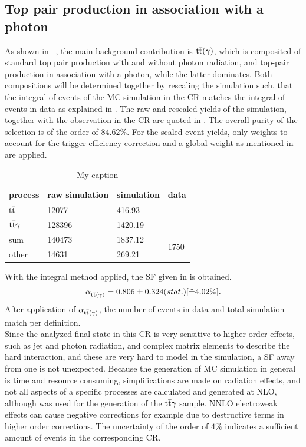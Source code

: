 \subsection{Top pair production in association with a photon}\label{sec:ttbar}
As shown in ~, the main background contribution is ${\mathrm{t}\overline{\mathrm{t}}}(\gamma)$, which is composited of standard top pair production with and without photon radiation, and top-pair production in association with a photon, while the latter dominates. Both compositions will be determined together by rescaling the simulation such, that the integral of events of the MC simulation in the CR matches the integral of events in data as explained in . The raw and rescaled yields of the simulation, together with the observation in the CR are quoted in . The overall purity of the selection is of the order of $84.62\%$. For the scaled event yields, only weights to account for the trigger efficiency correction and a global weight as mentioned in  are applied.
\begin{table}[htb]
 \centering
 \caption{My caption}
 \label{tab:CRTT}
 \begin{tabular}{llll}
  
  process      & raw simulation & simulation & data                  \\\hline
  ${\mathrm{t}\overline{\mathrm{t}}}$     & 12077          & 416.93     &                       \\
  ${\mathrm{t}\overline{\mathrm{t}}}\gamma$ & 128396         & 1420.19    &                       \\\hline\hline
  sum          & 140473         & 1837.12    & \multirow{2}{*}{1750} \\
  other        & 14631          & 269.21     &                       
 \end{tabular}
\end{table}
With the integral method applied, the SF given in  is obtained.
\begin{equation}\label{eq:AlphaTT}
 \alpha_{{\mathrm{t}\overline{\mathrm{t}}}(\gamma)}=0.806 \pm 0.324 (stat.) [\hat{=}4.02\%].
\end{equation}
After application of $\alpha_{{\mathrm{t}\overline{\mathrm{t}}}(\gamma)}$, the number of events in data and total simulation match per definition.\\
Since the analyzed final state in this CR is very sensitive to higher order effects, such as jet and photon radiation, and complex matrix elements to describe the hard interaction, and these are very hard to model in the simulation, a SF away from one is not unexpected. Because the generation of MC simulation in general is time and resource consuming, simplifications are made on \eg radiation effects, and not all aspects of a specific processes are calculated and generated at NLO, although \AMCATNLO was used for the generation of the ${\mathrm{t}\overline{\mathrm{t}}}\gamma$ sample. NNLO electroweak effects can cause negative corrections for example due to destructive terms in higher order corrections. The uncertainty of the order of $4\%$ indicates a sufficient amount of events in the corresponding CR.\\
